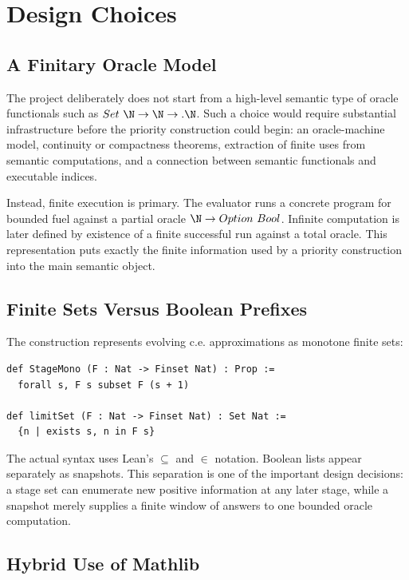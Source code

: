\section{Design Choices}

\subsection{A Finitary Oracle Model}

The project deliberately does not start from a high-level semantic type of
oracle functionals such as \(Set\ \N \to \N \to. \N\).  Such a choice would
require substantial infrastructure before the priority construction could
begin: an oracle-machine model, continuity or compactness theorems,
extraction of finite uses from semantic computations, and a connection
between semantic functionals and executable indices.

Instead, finite execution is primary.  The evaluator runs a concrete
program for bounded fuel against a partial oracle \(\N\to Option\ Bool\).
Infinite computation is later defined by existence of a finite successful
run against a total oracle.  This representation puts exactly the finite
information used by a priority construction into the main semantic object.

\subsection{Finite Sets Versus Boolean Prefixes}

The construction represents evolving c.e. approximations as monotone finite
sets:

\begin{lstlisting}
def StageMono (F : Nat -> Finset Nat) : Prop :=
  forall s, F s subset F (s + 1)

def limitSet (F : Nat -> Finset Nat) : Set Nat :=
  {n | exists s, n in F s}
\end{lstlisting}

The actual syntax uses Lean's \texttt{\(\subseteq\)} and \texttt{\(\in\)}
notation.  Boolean lists appear separately as snapshots.  This separation
is one of the important design decisions: a stage set can enumerate new
positive information at any later stage, while a snapshot merely supplies a
finite window of answers to one bounded oracle computation.

\subsection{Hybrid Use of Mathlib}

